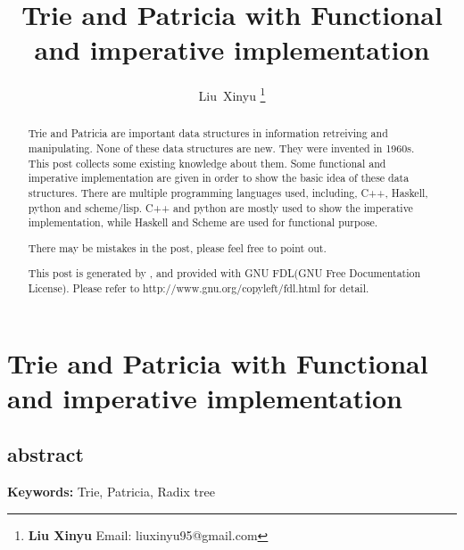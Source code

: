 \documentclass{article}
\begin{document}
\fi


\title{Trie and Patricia with Functional and imperative implementation}

\author{Liu~Xinyu
\thanks{{\bfseries Liu Xinyu } \newline
  Email: liuxinyu95@gmail.com \newline}
  }


\maketitle

\ifx\wholebook\relax
\chapter{Trie and Patricia with Functional and imperative implementation}

\section{abstract}
\else
\begin{abstract}
\fi
Trie and Patricia are important data structures in
information retreiving and manipulating. None of these data structures
are new. They were invented in 1960s. This post collects some
existing knowledge about them. Some functional and imperative
implementation are given in order to show the basic idea of these data structures.
There are multiple programming languages used, including, C++, Haskell, python and scheme/lisp.
C++ and python are mostly used to show the imperative implementation, while Haskell and Scheme are
used for functional purpose.

There may be mistakes in the post, please feel free to point out.

This post is generated by \LaTeXe, and provided with GNU FDL(GNU Free Documentation License).
Please refer to http://www.gnu.org/copyleft/fdl.html for detail.

\ifx\wholebook\relax\else
\end{abstract}
\fi

\vspace{3cm}
{\bfseries Keywords:} Trie, Patricia, Radix tree
\end{document}
